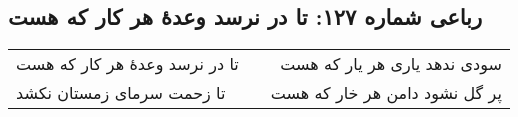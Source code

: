 \begin{center}
\section*{رباعی شماره ۱۲۷: تا در نرسد وعدهٔ هر کار که هست}
\label{sec:sh127}
\begin{longtable}{l p{0.5cm} r}
تا در نرسد وعدهٔ هر کار که هست
&&
سودی ندهد یاری هر یار که هست
\\
تا زحمت سرمای زمستان نکشد
&&
پر گل نشود دامن هر خار که هست
\\
\end{longtable}
\end{center}
